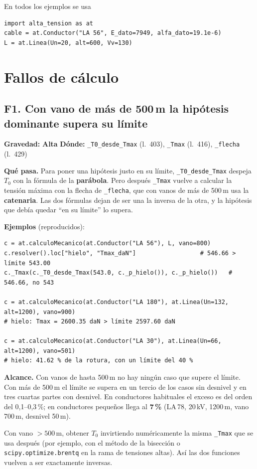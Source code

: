 \documentclass[11pt,a4paper]{article}
\newcommand{\alta}{\textcolor{alta}{\textbf{Alta}}}
\newcommand{\code}[1]{\texttt{#1}}
\newcommand{\fallo}[4]{%
  \subsection[#1. #2]{#1. #2}
  \noindent\textbf{Gravedad:} #3 \quad \textbf{Dónde:} #4\par\medskip}
\begin{document}
En todos los ejemplos se usa
\begin{lstlisting}
import alta_tension as at
cable = at.Conductor("LA 56", E_dato=7949, alfa_dato=19.1e-6)
L = at.Linea(Un=20, alt=600, Vv=130)
\end{lstlisting}

\section{Fallos de cálculo}

\fallo{F1}{Con vano de más de 500\,m la hipótesis dominante supera su límite}{\alta}{\code{\_T0\_desde\_Tmax} (l.~403), \code{\_Tmax} (l.~416), \code{\_flecha} (l.~429)}

\textbf{Qué pasa.} Para poner una hipótesis justo en su límite, \code{\_T0\_desde\_Tmax} despeja $T_0$ con la fórmula de la \textbf{parábola}. Pero después \code{\_Tmax} vuelve a calcular la tensión máxima con la flecha de \code{\_flecha}, que con vanos de más de 500\,m usa la \textbf{catenaria}. Las dos fórmulas dejan de ser una la inversa de la otra, y la hipótesis que debía quedar ``en su límite'' lo supera.

\textbf{Ejemplos} (reproducidos):
\begin{lstlisting}
c = at.calculoMecanico(at.Conductor("LA 56"), L, vano=800)
c.resolver().loc["hielo", "Tmax_daN"]                  # 546.66 > límite 543.00
c._Tmax(c._T0_desde_Tmax(543.0, c._p_hielo()), c._p_hielo())   # 546.66, no 543

c = at.calculoMecanico(at.Conductor("LA 180"), at.Linea(Un=132, alt=1200), vano=900)
# hielo: Tmax = 2600.35 daN > límite 2597.60 daN

c = at.calculoMecanico(at.Conductor("LA 30"), at.Linea(Un=66, alt=1200), vano=501)
# hielo: 41.62 % de la rotura, con un límite del 40 %
\end{lstlisting}

\textbf{Alcance.} Con vanos de hasta 500\,m no hay ningún caso que supere el límite. Con más de 500\,m el límite se supera en un tercio de los casos sin desnivel y en tres cuartas partes con desnivel. En conductores habituales el exceso es del orden del 0,1--0,3\,\%; en conductores pequeños llega al \textbf{7\,\%} (LA\,78, 20\,kV, 1200\,m, vano 700\,m, desnivel 50\,m).

\begin{arreglo}
Con vano $>500$\,m, obtener $T_0$ invirtiendo numéricamente la misma \code{\_Tmax} que se usa después (por ejemplo, con el método de la bisección o \code{scipy.optimize.brentq} en la rama de tensiones altas). Así las dos funciones vuelven a ser exactamente inversas.
\end{arreglo}
\end{document}
